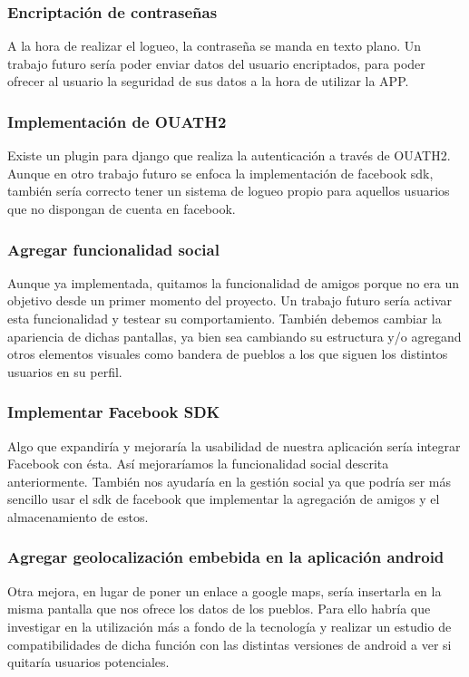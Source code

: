 \subsubsection{Encriptación de contraseñas}

A la hora de realizar el logueo, la contraseña se manda en texto plano. Un trabajo futuro sería poder enviar datos del usuario encriptados, para poder ofrecer al usuario la seguridad de sus datos a la hora de utilizar la APP.

\subsubsection{Implementación de OUATH2}
Existe un plugin para django que realiza la autenticación a través de OUATH2. Aunque en otro trabajo futuro se enfoca la implementación de facebook sdk, también sería correcto tener un sistema de logueo propio para aquellos usuarios que no dispongan de cuenta en facebook.

\subsubsection{Agregar funcionalidad social}
Aunque ya implementada, quitamos la funcionalidad de amigos porque no era un objetivo desde un primer momento del proyecto. Un trabajo futuro sería activar esta funcionalidad y testear su comportamiento. También debemos cambiar la apariencia de dichas pantallas, ya bien sea cambiando su estructura y/o agregand otros elementos visuales como bandera de pueblos a los que siguen los distintos usuarios en su perfil.

\subsubsection{Implementar Facebook SDK}
Algo que expandiría y mejoraría la usabilidad de nuestra aplicación sería integrar Facebook con ésta. Así mejoraríamos la funcionalidad social descrita anteriormente. También nos ayudaría en la gestión social ya que podría ser más sencillo usar el sdk de facebook que implementar la agregación de amigos y el almacenamiento de estos.

\subsubsection{Agregar geolocalización embebida en la aplicación android}
Otra mejora, en lugar de poner un enlace a google maps, sería insertarla en la misma pantalla que nos ofrece los datos de los pueblos. Para ello habría que investigar en la utilización más a fondo de la tecnología y realizar un estudio de compatibilidades de dicha función con las distintas versiones de android a ver si quitaría usuarios potenciales.

